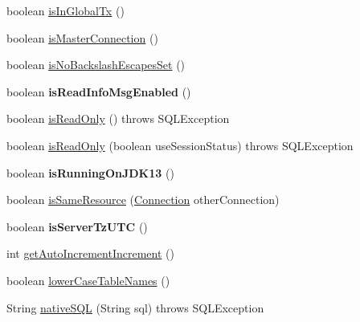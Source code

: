 \begin{DoxyCompactItemize}
boolean \mbox{\hyperlink{classcom_1_1mysql_1_1jdbc_1_1_connection_impl_a5d92d55b2f7afca920591ae53c73a1cd}{is\+In\+Global\+Tx}} ()
\item 
boolean \mbox{\hyperlink{classcom_1_1mysql_1_1jdbc_1_1_connection_impl_aac202776da9d2d04275ff2bde2c253b4}{is\+Master\+Connection}} ()
\item 
boolean \mbox{\hyperlink{classcom_1_1mysql_1_1jdbc_1_1_connection_impl_afe154ffa9d2d89f6a63cf352f86f357e}{is\+No\+Backslash\+Escapes\+Set}} ()
\item 
\mbox{\label{classcom_1_1mysql_1_1jdbc_1_1_connection_impl_a49d29240f30aca93261e02eed22906b6}} 
boolean {\bfseries is\+Read\+Info\+Msg\+Enabled} ()
\item 
boolean \mbox{\hyperlink{classcom_1_1mysql_1_1jdbc_1_1_connection_impl_a0f33455b0ae2424d31aad824e09f6672}{is\+Read\+Only}} ()  throws S\+Q\+L\+Exception 
\item 
boolean \mbox{\hyperlink{classcom_1_1mysql_1_1jdbc_1_1_connection_impl_a3f699d7389893a020730690607aae67c}{is\+Read\+Only}} (boolean use\+Session\+Status)  throws S\+Q\+L\+Exception 
\item 
\mbox{\label{classcom_1_1mysql_1_1jdbc_1_1_connection_impl_a9c31315298cf46a4a0f0c84d5e31eda2}} 
boolean {\bfseries is\+Running\+On\+J\+D\+K13} ()
\item 
boolean \mbox{\hyperlink{classcom_1_1mysql_1_1jdbc_1_1_connection_impl_a18299d4f2cf6b1092dfb30b5fbd33a5c}{is\+Same\+Resource}} (\mbox{\hyperlink{interfacecom_1_1mysql_1_1jdbc_1_1_connection}{Connection}} other\+Connection)
\item 
\mbox{\label{classcom_1_1mysql_1_1jdbc_1_1_connection_impl_a0f4b0a2a1ec19f6503cf99ce8a5067b3}} 
boolean {\bfseries is\+Server\+Tz\+U\+TC} ()
\item 
int \mbox{\hyperlink{classcom_1_1mysql_1_1jdbc_1_1_connection_impl_aa8687ff453437195ecc1ee3d3598e4a6}{get\+Auto\+Increment\+Increment}} ()
\item 
boolean \mbox{\hyperlink{classcom_1_1mysql_1_1jdbc_1_1_connection_impl_a50a7db180dd968c196dfd94f2bb476fb}{lower\+Case\+Table\+Names}} ()
\item 
String \mbox{\hyperlink{classcom_1_1mysql_1_1jdbc_1_1_connection_impl_aa0f6347854ada6c4c6334d3cb0414a8d}{native\+S\+QL}} (String sql)  throws S\+Q\+L\+Exception 

\end{DoxyCompactItemize}
